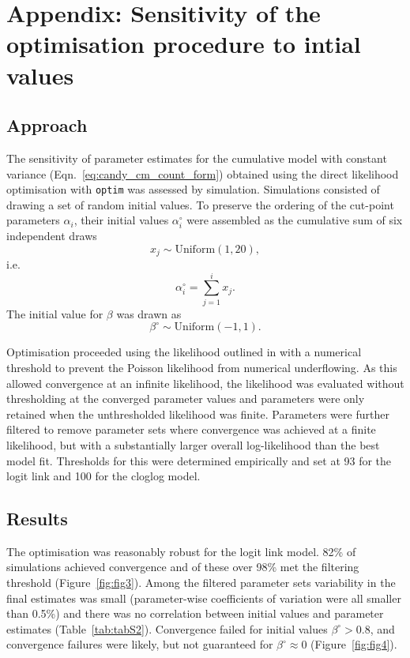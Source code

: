 \newpage
\appendix
\renewcommand\thefigure{S\arabic{figure}}    
\setcounter{figure}{0} 
\renewcommand\thetable{S\arabic{table}}    
\setcounter{table}{0}

\section{Appendix: Sensitivity of the optimisation procedure to intial values}
\subsection{Approach}
\label{sec:appendix}
The sensitivity of parameter estimates for the cumulative model with constant variance (Eqn.~\ref{eq:candy_cm_count_form}) obtained using the direct likelihood optimisation with \verb+optim+ was assessed by simulation.
Simulations consisted of drawing a set of random initial values. To preserve the ordering of the cut-point parameters $\alpha_i$, their initial values $\alpha^{\circ}_i$ were assembled as the cumulative sum of six independent draws $$x_j \sim \mathrm{Uniform}(1,20),$$ i.e. $$\alpha^{\circ}_i = \sum_{j=1}^i x_j.$$ The initial value for $\beta$ was drawn as $$\beta^{\circ}\sim\mathrm{Uniform}(-1,1).$$

Optimisation proceeded using the likelihood outlined in with a numerical threshold to prevent the Poisson likelihood from numerical underflowing. As this allowed convergence at an infinite likelihood, the likelihood was evaluated without thresholding at the converged parameter values and parameters were only retained when the unthresholded likelihood was finite. 
Parameters were further filtered to remove parameter sets where convergence was achieved at a finite likelihood, but with a substantially larger overall log-likelihood than the best model fit. Thresholds for this were determined empirically and set at 93 for the logit link and 100 for the cloglog model.

\subsection{Results}
The optimisation was reasonably robust for the logit link model. 82\% of simulations achieved convergence and of these over 98\% met the filtering threshold (Figure~\ref{fig:fig3}). Among the filtered parameter sets variability in the final estimates was small (parameter-wise coefficients of variation were all smaller than 0.5\%) and there was no correlation between initial values and parameter estimates (Table~\ref{tab:tabS2}). Convergence failed for initial values $\beta^{\circ}>0.8$, and convergence failures were likely, but not guaranteed for $\beta^{\circ}\approx 0$ (Figure~\ref{fig:fig4}).

